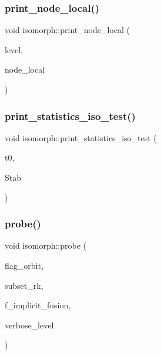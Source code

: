 \subsubsection{\texorpdfstring{print\+\_\+node\+\_\+local()}{print\_node\_local()}}
{\footnotesize\ttfamily void isomorph\+::print\+\_\+node\+\_\+local (\begin{DoxyParamCaption}\item[{\mbox{\hyperlink{galois_8h_a09fddde158a3a20bd2dcadb609de11dc}{I\+NT}}}]{level,  }\item[{\mbox{\hyperlink{galois_8h_a09fddde158a3a20bd2dcadb609de11dc}{I\+NT}}}]{node\+\_\+local }\end{DoxyParamCaption})}

\mbox{\label{classisomorph_a92a0591020464dd4974d2b17f7be862b}} 
\subsubsection{\texorpdfstring{print\+\_\+statistics\+\_\+iso\+\_\+test()}{print\_statistics\_iso\_test()}}
{\footnotesize\ttfamily void isomorph\+::print\+\_\+statistics\+\_\+iso\+\_\+test (\begin{DoxyParamCaption}\item[{\mbox{\hyperlink{galois_8h_a09fddde158a3a20bd2dcadb609de11dc}{I\+NT}}}]{t0,  }\item[{\mbox{\hyperlink{classsims}{sims}} $\ast$}]{Stab }\end{DoxyParamCaption})}

\mbox{\label{classisomorph_a9cb6fed7b6ac639d886b117a1f454441}} 
\subsubsection{\texorpdfstring{probe()}{probe()}}
{\footnotesize\ttfamily void isomorph\+::probe (\begin{DoxyParamCaption}\item[{\mbox{\hyperlink{galois_8h_a09fddde158a3a20bd2dcadb609de11dc}{I\+NT}}}]{flag\+\_\+orbit,  }\item[{\mbox{\hyperlink{galois_8h_a09fddde158a3a20bd2dcadb609de11dc}{I\+NT}}}]{subset\+\_\+rk,  }\item[{\mbox{\hyperlink{galois_8h_a09fddde158a3a20bd2dcadb609de11dc}{I\+NT}}}]{f\+\_\+implicit\+\_\+fusion,  }\item[{\mbox{\hyperlink{galois_8h_a09fddde158a3a20bd2dcadb609de11dc}{I\+NT}}}]{verbose\+\_\+level }\end{DoxyParamCaption})}

